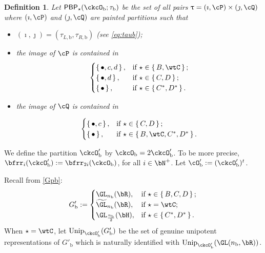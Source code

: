 \documentclass[12pt,a4paper]{amsart}
\def\abs#1{\left|{#1}\right|}
\numberwithin{equation}{section}
\newtheorem{defn}[thm]{Definition}
\theoremstyle{remark}
\def\half{{\tfrac{1}{2}}}
\def\Unip{\mathrm{Unip}}
\def\cupcol{{\stackrel{c}{\sqcup}}}
\def\cupcol{{\,\stackrel{c}{\sqcup}\,}}
\def\ckcOb{\ckcO_{\mathrm b}}
\def\ckcOpb{\ckcO'_{\mathrm b}}
\def\Gpb{G'_{\mathrm b}}
\def\PBPs{\mathsf{PBP}_{\star}}
\begin{document}
\begin{defn}
  Let $\PBPs(\ckcOb;\tau_{\mathrm b})$ be the set of all pairs
  $\uptau = (\imath,\cP)\times(\jmath,\cQ)$ where $(\imath,\cP)$ and
  $(\jmath,\cQ)$ are painted partitions such that
  \begin{itemize}
    \item $(\imath,\jmath) = (\tau_{L,\mathrm b},\tau_{R,\mathrm b})$ (see \eqref{eq:taub});
    \item the image of $\cP$ is contained in
          \[
          \begin{cases}
            \set{\bullet, c,d},  & \text{if } \star\in \set{B,\wtC}; \\
            \set{\bullet, d},  & \text{if } \star\in \set{C,D};\\
            \set{\bullet},  & \text{if } \star\in \set{C^{*},D^{*}}.\\
          \end{cases}
          \]
    \item the image of $\cQ$ is contained in

          \[
          \begin{cases}
            \set{\bullet, c},  & \text{if } \star\in \set{C,D};\\
            \set{\bullet},  & \text{if } \star\in \set{B,\wtC, C^{*},D^{*}}.\\
          \end{cases}
          \]
  \end{itemize}
\end{defn}

We define the partition $\ckcOpb$ by $\ckcOb = 2\ckcOpb$. To be more precise, $\bfrr_{i}(\ckcO'_{\mathrm b}):= \bfrr_{2i}(\ckcO_{\mathrm b})$, for all $i\in \bN^{+}$. Let $\cO'_{\mathrm b}:= (\ckcO'_{\mathrm b})^{t}$.

Recall from \eqref{Gpb}:
\[
  G'_{\mathrm b} := \begin{cases}
    \GL_{n_{\mathrm b}}(\bR), & \text{if } \star \in \set{B,C,D}; \\
    \widetilde{\GL}_{n_{\mathrm b}}(\bR), & \text{if } \star = \wtC; \\
    \GL_{\frac{n_{\mathrm b}}{2}}(\bH), & \text{if } \star \in \set{C^{*},D^{*}}.\\
  \end{cases}
\]
When $\star=\wtC$, let $\Unip_{\ckcOpb}(\Gpb)$ be the set of genuine unipotent
representations of $\Gpb$ which is naturally identified with
$\Unip_{\ckcOpb}(\GL(n_{\mathrm b},\bR))$.
\end{document}
